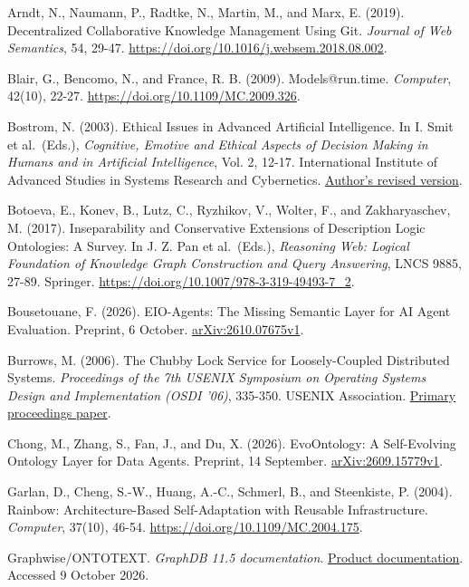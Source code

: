 \documentclass[preprint,12pt,authoryear]{elsarticle}
\begin{document}
Arndt, N., Naumann, P., Radtke, N., Martin, M., and Marx, E. (2019).
Decentralized Collaborative Knowledge Management Using Git.
\emph{Journal of Web Semantics}, 54, 29-47.
\url{https://doi.org/10.1016/j.websem.2018.08.002}.

Blair, G., Bencomo, N., and France, R. B. (2009). Models@run.time.
\emph{Computer}, 42(10), 22-27.
\url{https://doi.org/10.1109/MC.2009.326}.

Bostrom, N. (2003). Ethical Issues in Advanced Artificial Intelligence.
In I. Smit et al.~(Eds.), \emph{Cognitive, Emotive and Ethical Aspects
of Decision Making in Humans and in Artificial Intelligence}, Vol. 2,
12-17. International Institute of Advanced Studies in Systems Research
and Cybernetics.
\href{https://nickbostrom.com/papers/ethical-issues-in-advanced-ai/}{Author's
revised version}.

Botoeva, E., Konev, B., Lutz, C., Ryzhikov, V., Wolter, F., and
Zakharyaschev, M. (2017). Inseparability and Conservative Extensions of
Description Logic Ontologies: A Survey. In J. Z. Pan et al.~(Eds.),
\emph{Reasoning Web: Logical Foundation of Knowledge Graph Construction
and Query Answering}, LNCS 9885, 27-89. Springer.
\url{https://doi.org/10.1007/978-3-319-49493-7_2}.

Bousetouane, F. (2026). EIO-Agents: The Missing Semantic Layer for AI
Agent Evaluation. Preprint, 6 October.
\href{https://arxiv.org/abs/2610.07675v1}{arXiv:2610.07675v1}.

Burrows, M. (2006). The Chubby Lock Service for Loosely-Coupled
Distributed Systems. \emph{Proceedings of the 7th USENIX Symposium on
Operating Systems Design and Implementation (OSDI '06)}, 335-350. USENIX
Association.
\href{https://www.usenix.org/legacy/events/osdi06/tech/full_papers/burrows/burrows.pdf}{Primary
proceedings paper}.

Chong, M., Zhang, S., Fan, J., and Du, X. (2026). EvoOntology: A
Self-Evolving Ontology Layer for Data Agents. Preprint, 14 September.
\href{https://arxiv.org/abs/2609.15779v1}{arXiv:2609.15779v1}.

Garlan, D., Cheng, S.-W., Huang, A.-C., Schmerl, B., and Steenkiste, P.
(2004). Rainbow: Architecture-Based Self-Adaptation with Reusable
Infrastructure. \emph{Computer}, 37(10), 46-54.
\url{https://doi.org/10.1109/MC.2004.175}.

Graphwise/ONTOTEXT. \emph{GraphDB 11.5 documentation}.
\href{https://graphdb.ontotext.com/documentation/11.5/}{Product
documentation}. Accessed 9 October 2026.
\end{document}
